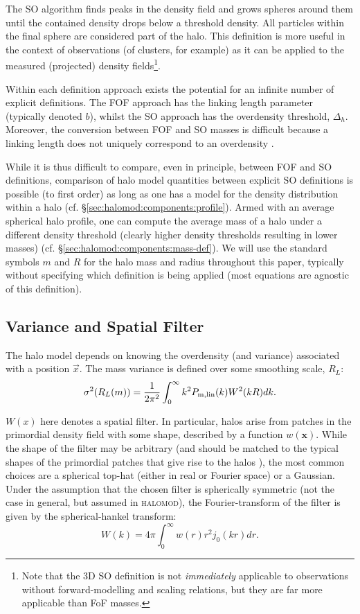 \documentclass[5p,aas_macros]{elsarticle}
\newcommand{\halomod}{\textsc{halomod}}
\begin{document}
The SO algorithm finds peaks in the density field and grows spheres around them until the contained density drops below a threshold density.
All particles within the final sphere are considered part of the halo. 
This definition is more useful in the context of observations (of clusters, for example) as it can be applied to the measured (projected) density fields\footnote{Note that the 3D SO definition is not \textit{immediately} applicable to observations without forward-modelling and scaling relations, but they are far more applicable than FoF masses.}. 

Within each definition approach exists the potential for an infinite number of explicit definitions. The FOF approach has the linking length parameter (typically denoted $b$), whilst the SO approach has the overdensity threshold, $\Delta_h$. Moreover, the conversion between FOF and SO masses is difficult because a linking length does not uniquely correspond to an overdensity \citep{More2011}.

While it is thus difficult to compare, even in principle, between FOF and SO definitions, comparison of halo model quantities between explicit SO definitions is possible (to first order) as long as one has a model for the density distribution within a halo (cf. \S\ref{sec:halomod:components:profile}).
Armed with an average spherical halo profile, one can compute the average mass of a halo under a different density threshold (clearly higher density thresholds resulting in lower masses) (cf. \S\ref{sec:halomod:components:mass-def}). 
We will use the standard symbols $m$ and $R$ for the halo mass and radius throughout this paper, typically without specifying which definition is being applied (most equations are agnostic of this definition). 


\subsection{Variance and Spatial Filter}
\label{sec:theory:filter}
The halo model depends on knowing the overdensity (and variance) associated with a position $\vec{x}$. 
The mass variance is defined over some smoothing scale, $R_L$:
\begin{equation}
	\label{eq:massvariance}
	\sigma^2(R_L(m)) = \frac{1}{2\pi^2}\int_0^\infty{k^2P_{\rm m, lin}(k)W^2(kR)dk}.
\end{equation}

$W(x)$ here denotes a spatial filter.
In particular, halos arise from patches in the primordial density field with some shape, described by a function $w(\mathbf{x})$.
While the shape of the filter may be arbitrary (and should be matched to the typical shapes of the primordial patches that give rise to the halos \citep{Dalal2010, Chan2017,Diemer2019}), the most common choices are a spherical top-hat (either in real or Fourier space) or a Gaussian.
Under the assumption that the chosen filter is spherically symmetric (not the case in general, but assumed in \halomod), the Fourier-transform of the filter is given by the spherical-hankel transform:
\begin{equation}
    W(k) = 4\pi \int_0^\infty w(r) r^2 j_0(kr) dr.
\end{equation}
\end{document}
